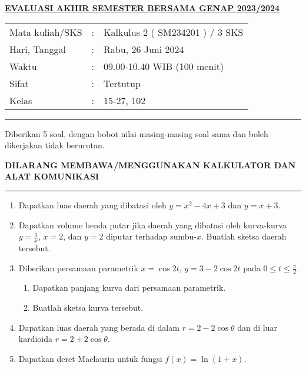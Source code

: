 \documentclass[11pt,openany,a4paper]{article}
\begin{document}
    \newpage
    \pagestyle{problems}

    \begin{center}
	{\underline{\textbf{\MakeUppercase{Evaluasi Akhir Semester Bersama Genap 2023/2024}}}}
    \end{center}

    \begin{center}
	\begin{tabular}{lcl}
		Mata kuliah/SKS & : & Kalkulus 2 ( SM234201 ) / 3 SKS\\
		Hari, Tanggal & : & Rabu, 26 Juni 2024\\
		Waktu & : & 09.00-10.40 WIB (100 menit)\\
		Sifat & : & Tertutup\\
		Kelas & : & 15-27, 102
	\end{tabular}
    \end{center}
	
    \noindent\rule{\textwidth}{2.pt}
	
    \setlength{\parindent}{5pt}
    \par Diberikan 5 soal, dengan bobot nilai masing-masing soal sama dan boleh dikerjakan tidak berurutan.
    \setlength{\parindent}{5pt}
    \setlength{\parindent}{5pt}
    {\small
    \par \textbf{\MakeUppercase{Dilarang membawa/menggunakan kalkulator dan alat komunikasi}}
    }
    \par {}
	
    \noindent\rule{\textwidth}{2.pt}
	
\begin{enumerate}
    \item Dapatkan luas daerah yang dibatasi oleh \( y = x^2 - 4x + 3 \) dan \( y = x + 3 \).

    \item Dapatkan volume benda putar jika daerah yang dibatasi oleh kurva-kurva 
    \( y = \frac{1}{x} \), \( x = 2 \), dan \( y = 2 \) diputar terhadap sumbu-\( x \). 
    Buatlah sketsa daerah tersebut.

    \item Diberikan persamaan parametrik \( x = \cos 2t \), \( y = 3 - 2 \cos 2t \) pada \( 0 \leq t \leq \frac{\pi}{2} \).
    \begin{enumerate}
        \item Dapatkan panjang kurva dari persamaan parametrik.
        \item Buatlah sketsa kurva tersebut.
    \end{enumerate}

    \item Dapatkan luas daerah yang berada di dalam \( r = 2 - 2 \cos \theta \) dan di luar kardioida 
    \( r = 2 + 2 \cos \theta \).

    \item Dapatkan deret Maclaurin untuk fungsi \( f(x) = \ln(1 + x) \).
\end{enumerate}
	
\end{document}
